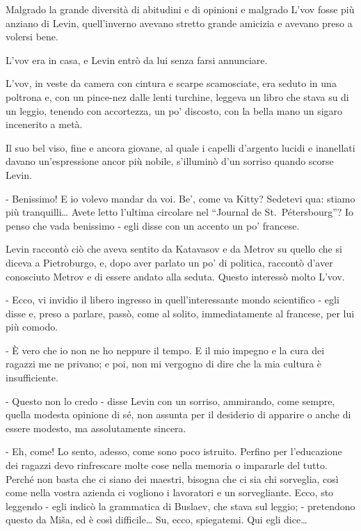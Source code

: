 Malgrado la grande diversità di abitudini e di opinioni e malgrado L'vov fosse più anziano di Levin, quell'inverno avevano stretto grande amicizia e avevano preso a volersi bene. 

L'vov era in casa, e Levin entrò da lui senza farsi annunciare. 

L'vov, in veste da camera con cintura e scarpe scamosciate, era seduto in una poltrona e, con un pince-nez dalle lenti turchine, leggeva un libro che stava su di un leggio, tenendo con accortezza, un po' discosto, con la bella mano un sigaro incenerito a metà. 

Il suo bel viso, fine e ancora giovane, al quale i capelli d'argento lucidi e inanellati davano un'espressione ancor più nobile, s'illuminò d'un sorriso quando scorse Levin. 

- Benissimo! E io volevo mandar da voi. Be', come va Kitty? Sedetevi qua: stiamo più tranquilli\ldots{} Avete letto l'ultima circolare nel ``Journal de St.~Pétersbourg''? Io penso che vada benissimo - egli disse con un accento un po' francese. 

Levin raccontò ciò che aveva sentito da Katavasov e da Metrov su quello che si diceva a Pietroburgo, e, dopo aver parlato un po' di politica, raccontò d'aver conosciuto Metrov e di essere andato alla seduta. Questo interessò molto L'vov. 

- Ecco, vi invidio il libero ingresso in quell'interessante mondo scientifico - egli disse e, preso a parlare, passò, come al solito, immediatamente al francese, per lui più comodo. 

- È vero che io non ne ho neppure il tempo. E il mio impegno e la cura dei ragazzi me ne privano; e poi, non mi vergogno di dire che la mia cultura è insufficiente. 

- Questo non lo credo - disse Levin con un sorriso, ammirando, come sempre, quella modesta opinione di sé, non assunta per il desiderio di apparire o anche di essere modesto, ma assolutamente sincera. 

- Eh, come! Lo sento, adesso, come sono poco istruito. Perfino per l'educazione dei ragazzi devo rinfrescare molte cose nella memoria o impararle del tutto. Perché non basta che ci siano dei maestri, bisogna che ci sia chi sorveglia, così come nella vostra azienda ci vogliono i lavoratori e un sorvegliante. Ecco, sto leggendo - egli indicò la grammatica di Buslaev, che stava sul leggio; - pretendono questo da Miša, ed è così difficile\ldots{} Su, ecco, spiegatemi. Qui egli dice\ldots{} 

